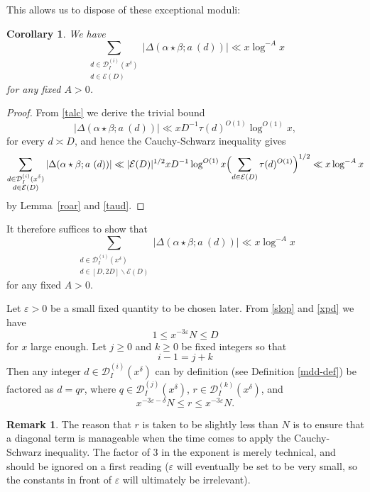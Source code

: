 \documentclass[12pt,a4paper,reqno]{amsart}
\numberwithin{equation}{section}
\theoremstyle{plain}
\newtheorem{corollary}[theorem]{Corollary}
\theoremstyle{definition}
\newtheorem{remark}[theorem]{Remark}
\newcommand\eps{\varepsilon}
\newcommand{\DI}[3]{\mathcal{D}_{{#1}}^{({#2})}({#3})}
\renewcommand{\sim}{\asymp}
\begin{document}
This allows us to dispose of these exceptional moduli:

\begin{corollary} We have
$$
\sum_{\substack{d \in \DI{I}{i}{x^\delta} \\ d\in \mathcal{E}(D)}}
|\Delta(\alpha \star \beta; a\ (d))| \ll x \log^{-A} x
$$
for any fixed $A>0$.
\end{corollary}

\begin{proof} %
  From \eqref{talc} we derive the trivial bound
$$ 
|\Delta(\alpha \star \beta; a\ (d))| \ll x D^{-1} \tau(d)^{O(1)}
\log^{O(1)} x,
$$ 
for every $d \sim D$, and hence the Cauchy-Schwarz inequality gives
$$
\sum_{\substack{d \in \DI{I}{i}{x^\delta}\\ d\in \mathcal{E}(D)}}
|\Delta(\alpha \star \beta; a\ (d))| \ll |\mathcal{E}(D)|^{1/2} xD^{-1}\log^{O(1)}x\Bigl(
 \sum_{d\in \mathcal{E}(D)} \tau(d)^{O(1)}
\Bigr)^{1/2} \ll x\log^{-A} x
$$
by Lemma~\ref{roar} and \eqref{taud}.
\end{proof}

It therefore suffices to show that
\begin{equation}\label{summa}
  \sum_{\substack{d \in \DI{I}{i}{x^\delta}\\d \in [D,2D] \backslash \mathcal{E}(D)}} 
  |\Delta(\alpha \star \beta; a\ (d))| \ll x \log^{-A} x
\end{equation}
for any fixed $A>0$.

Let $\eps>0$ be a small fixed quantity to be chosen later.  From
\eqref{slop} and \eqref{xpd} we have
$$
1\leq x^{-3\eps}N\leq D
$$
for $x$ large enough. Let $j\geq 0$ and $k\geq 0$ be fixed integers so that
\begin{equation}\label{waffle}
  i-1=j+k
\end{equation}
Then any integer $d\in \DI{I}{i}{x^{\delta}}$ can by definition (see
Definition \ref{mdd-def}) be factored as $d = qr$, where $q \in
\DI{I}{j}{x^\delta}$, $r \in \DI{I}{k}{x^\delta}$, and
$$
x^{-3\eps-\delta} N \leq r \leq x^{-3\eps} N.
$$

\begin{remark}
  The reason that $r$ is taken to be slightly less than $N$ is to
  ensure that a diagonal term is manageable when the time comes to
  apply the Cauchy-Schwarz inequality. The factor of $3$ in the
  exponent is merely technical, and should be ignored on a first
  reading ($\eps$ will eventually be set to be very small, so the
  constants in front of $\eps$ will ultimately be irrelevant).
\end{remark}
\end{document}
